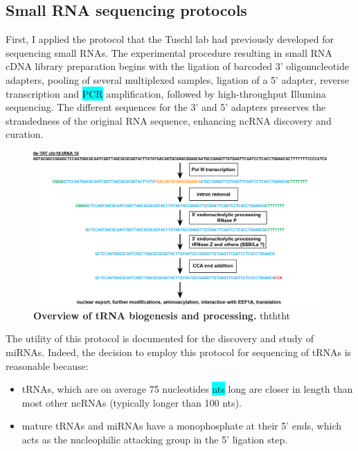 \documentclass[12pt]{rockefeller}
\newcommand{\cyan}[1]{\colorbox{cyan}{#1}}
\begin{document}
\subsection{Small RNA sequencing protocols}
First, I applied the protocol that the Tuschl lab had previously developed for sequencing small RNAs. The experimental procedure resulting in small RNA cDNA library preparation begins with the ligation of barcoded 3' oligonucleotide adapters, pooling of several multiplexed samples, ligation of a 5' adapter, reverse transcription and \cyan{PCR} amplification, followed by high-throughput Illumina sequencing. The different sequences for the 3' and 5' adapters preserves the strandedness of the original RNA sequence, enhancing ncRNA discovery and curation. 
\begin{figure}[!ht]%
\centering
\includegraphics[width=\textwidth]{biogenesis.png}%
\caption[tRNA biogensis]{\textbf{Overview of tRNA biogenesis and processing.} thththt}
\label{biogenesis}%
\end{figure}

The utility of this protocol is documented for the discovery and study of miRNAs. Indeed, the decision to employ this protocol for sequencing of tRNAs is reasonable because:
\begin{itemize}
\item tRNAs, which are on average 75 nucleotides \cyan{nts} long are closer in length than most other ncRNAs (typically longer than 100 nts). 
\item mature tRNAs and miRNAs have a monophosphate at their 5' ends, which acts as the nucleophilic attacking group in the 5' ligation step. 
\end{itemize}
\end{document}

